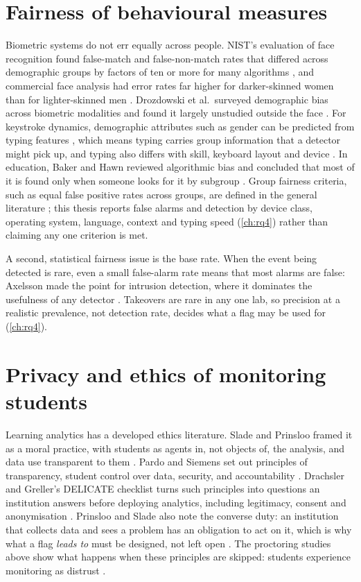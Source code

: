 \section{Fairness of behavioural measures}
\label{sec:rw-fairness}
Biometric systems do not err equally across people. NIST's evaluation of face
recognition found false-match and false-non-match rates that differed across
demographic groups by factors of ten or more for many algorithms
\cite{grother2019frvt}, and commercial face analysis had error rates far
higher for darker-skinned women than for lighter-skinned men
\cite{buolamwini2018gender}. Drozdowski et al.\ surveyed demographic bias
across biometric modalities and found it largely unstudied outside the face
\cite{drozdowski2020bias}. For keystroke dynamics, demographic attributes such
as gender can be predicted from typing features \cite{tsimperidis2018gender},
which means typing carries group information that a detector might pick up,
and typing also differs with skill, keyboard layout and device
\cite{dhakal2018typing}. In education, Baker and Hawn reviewed algorithmic bias
and concluded that most of it is found only when someone looks for it by
subgroup \cite{baker2022bias}. Group fairness criteria, such as equal false
positive rates across groups, are defined in the general literature
\cite{barocas2023fairml}; this thesis reports false alarms and detection by
device class, operating system, language, context and typing speed
(\cref{ch:rq4}) rather than claiming any one criterion is met.

A second, statistical fairness issue is the base rate. When the event being
detected is rare, even a small false-alarm rate means that most alarms are
false: Axelsson made the point for intrusion detection, where it dominates
the usefulness of any detector \cite{axelsson2000baserate}. Takeovers are rare
in any one lab, so precision at a realistic prevalence, not detection rate,
decides what a flag may be used for (\cref{ch:rq4}).

\section{Privacy and ethics of monitoring students}
\label{sec:rw-privacy}
Learning analytics has a developed ethics literature. Slade and Prinsloo
framed it as a moral practice, with students as agents in, not objects of,
the analysis, and data use transparent to them \cite{slade2013ethics}. Pardo
and Siemens set out principles of transparency, student control over data,
security, and accountability \cite{pardo2014ethical}. Drachsler and Greller's
DELICATE checklist turns such principles into questions an institution
answers before deploying analytics, including legitimacy, consent and
anonymisation \cite{drachsler2016delicate}. Prinsloo and Slade also note the
converse duty: an institution that collects data and sees a problem has an
obligation to act on it, which is why what a flag \emph{leads to} must be
designed, not left open \cite{prinsloo2017elephant}. The proctoring studies
above show what happens when these principles are skipped: students experience
monitoring as distrust \cite{balash2021examining,coghlan2021proctor}.

